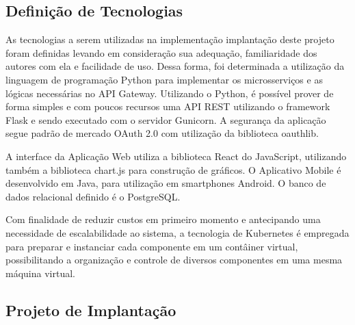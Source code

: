 \subsection{Definição de Tecnologias}

As tecnologias a serem utilizadas na implementação implantação deste projeto foram definidas levando em consideração sua adequação, familiaridade dos autores com ela e facilidade de uso. Dessa forma, foi determinada a utilização da linguagem de programação Python para implementar os microsserviços e as lógicas necessárias no API Gateway. Utilizando o Python, é possível prover de forma simples e com poucos recursos uma API REST utilizando o framework Flask e sendo executado com o servidor Gunicorn. A segurança da aplicação segue padrão de mercado OAuth 2.0 com utilização da biblioteca oauthlib.

A interface da Aplicação Web utiliza a biblioteca React do JavaScript, utilizando também a biblioteca chart.js para construção de gráficos. O Aplicativo Mobile é desenvolvido em Java, para utilização em smartphones Android. O banco de dados relacional definido é o PostgreSQL. 

Com finalidade de reduzir custos em primeiro momento e antecipando uma necessidade de escalabilidade ao sistema, a tecnologia de Kubernetes é empregada para preparar e instanciar cada componente em um contâiner virtual, possibilitando a organização e controle de diversos componentes em uma mesma máquina virtual.


\subsection{Projeto de Implantação}

